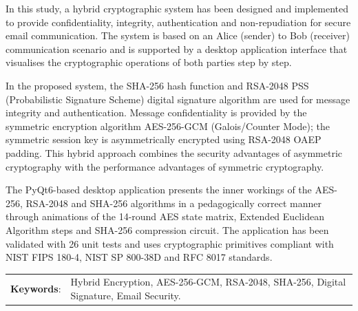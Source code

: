 In this study, a hybrid cryptographic system has been designed and implemented to provide confidentiality, integrity, authentication and non-repudiation for secure email communication. The system is based on an Alice (sender) to Bob (receiver) communication scenario and is supported by a desktop application interface that visualises the cryptographic operations of both parties step by step.

In the proposed system, the SHA-256 hash function and RSA-2048 PSS (Probabilistic Signature Scheme) digital signature algorithm are used for message integrity and authentication. Message confidentiality is provided by the symmetric encryption algorithm AES-256-GCM (Galois/Counter Mode); the symmetric session key is asymmetrically encrypted using RSA-2048 OAEP padding. This hybrid approach combines the security advantages of asymmetric cryptography with the performance advantages of symmetric cryptography.

The PyQt6-based desktop application presents the inner workings of the AES-256, RSA-2048 and SHA-256 algorithms in a pedagogically correct manner through animations of the 14-round AES state matrix, Extended Euclidean Algorithm steps and SHA-256 compression circuit. The application has been validated with 26 unit tests and uses cryptographic primitives compliant with NIST FIPS 180-4, NIST SP 800-38D and RFC 8017 standards.

\vspace{3mm}

 \begin{tabular}{ll}
 	{\textbf{Keywords}:} & { Hybrid Encryption, AES-256-GCM, RSA-2048, SHA-256, Digital Signature, Email Security.}  \\   	
 \end{tabular} 

 




